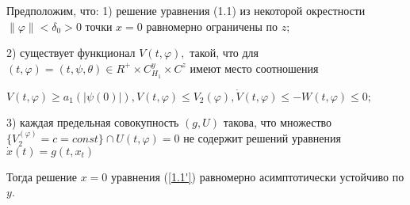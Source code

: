 		\begin{theorem}\label{t-1.12} Предположим, что: 
			1) решение уравнения (1.1) из некоторой окрестности ${\| \varphi \| < \delta_0 > 0}$ точки $x = 0$ равномерно ограничены по $z;$
			
			2) существует функционал $V(t, \varphi), $ такой, что для $(t, \varphi) = (t, \psi, \theta) \in R^+ \times C^y_{H_1} \times C^z$ имеют место соотношения
			
			$V(t, \varphi) \ge a_1(| \psi(0) |), V(t, \varphi) \le V_2(\varphi), \dot V(t, \varphi) \le - W(t, \varphi) \le 0;$
			
			3) каждая предельная совокупность $(g, U)$ такова, что множество $ \lbrace V_2^(\varphi) = c = const \rbrace \cap {U(t, \varphi) = 0}$ не содержит решений уравнения $\dot x(t) = g(t, x_t)$
			
			Тогда решение $x = 0$ уравнения (\ref{1.1'}) равномерно асимптотически устойчиво по $y$.			
			
		\end{theorem}

